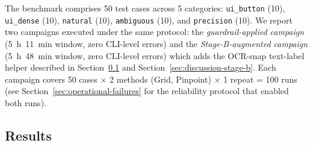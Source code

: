 \documentclass[sigconf,nonacm]{acmart}
\begin{document}
The benchmark comprises 50 test cases across 5 categories:
\texttt{ui\_button} (10), \texttt{ui\_dense} (10), \texttt{natural} (10),
\texttt{ambiguous} (10), and \texttt{precision} (10).  We report two
campaigns executed under the same protocol: the
\emph{guardrail-applied campaign} (5~h~11~min window, zero
CLI-level errors) and the \emph{Stage-B-augmented campaign}
(5~h~48~min window, zero CLI-level errors) which adds the
OCR-snap text-label helper described in
Section~\ref{sec:results} and Section~\ref{sec:discussion-stage-b}.
Each campaign covers 50 cases $\times$ 2 methods
(Grid, Pinpoint) $\times$ 1 repeat = 100 runs (see
Section~\ref{sec:operational-failures} for the reliability
protocol that enabled both runs).


\subsection{Results}
\label{sec:results}

\begin{table}[t]
\caption{Mean localization error in pixels ($\downarrow$ is better)
  for the v6 and v7 Pinpoint campaigns; Grid columns show the shared v6
  baseline. ``$n$'' gives the number of valid (non-FAIL) runs. Grid uses
  12-line binary search with 2560\,px upscale, $1024$\,px zoom, and
  forced zoom-on-hit.  Pinpoint adds Phase~1.5 (anchor with
  \textsc{visible}/\textsc{absent} check) and Phase~2 (Monte Carlo dot
  voting); v7 adds the Stage~B refinement layer.
}
\label{tab:results-error}
\end{table}
\end{document}
